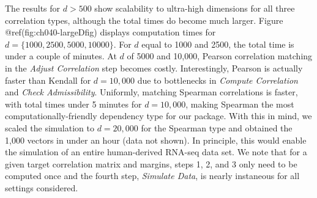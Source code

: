 \documentclass{article}
\begin{document}
The results for \(d > 500\) show scalability to ultra-high dimensions
for all three correlation types, although the total times do become much
larger. Figure @ref(fig:ch040-largeDfig) displays computation times for
\(d=\{1000, 2500, 5000, 10000\}\). For \(d\) equal to 1000 and 2500, the
total time is under a couple of minutes. At \(d\) of 5000 and 10,000,
Pearson correlation matching in the \emph{Adjust Correlation} step
becomes costly. Interestingly, Pearson is actually faster than Kendall
for \(d=10,000\) due to bottlenecks in \emph{Compute Correlation} and
\emph{Check Admissibility}. Uniformly, matching Spearman correlations is
faster, with total times under 5 minutes for \(d=10,000\), making
Spearman the most computationally-friendly dependency type for our
package. With this in mind, we scaled the simulation to \(d=20,000\) for
the Spearman type and obtained the 1,000 vectors in under an hour (data
not shown). In principle, this would enable the simulation of an entire
human-derived RNA-seq data set. We note that for a given target
correlation matrix and margins, steps 1, 2, and 3 only need to be
computed once and the fourth step, \emph{Simulate Data}, is nearly
instaneous for all settings considered.
\end{document}
